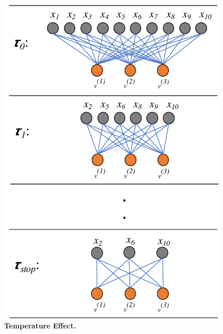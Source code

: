 \documentclass{bioinfo}
\begin{document}
\begin{figure}[h!]
    \centering
    \includegraphics[scale=0.5]{fig/temp-change.pdf}
    \caption{\textbf{Temperature Effect.}  }
    \label{fig:temp-change}
\end{figure}
\end{document}
